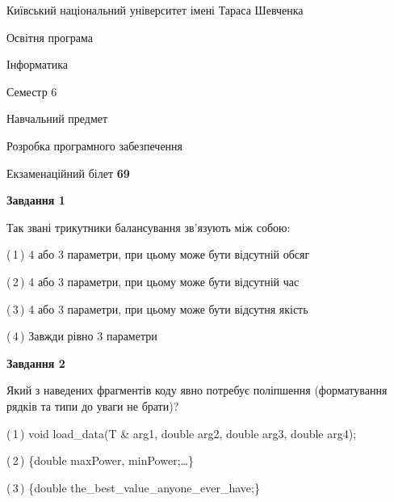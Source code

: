 \documentclass[10pt, ukrainian]{article}
\begin{document}
{{\begin {small}\par
{ \center  Київський національний університет імені Тараса Шевченка \par}
{\parbox {5 cm}{Освітня програма \hfill}{\parbox {7 cm}{Інформатика \hfill}}\parbox {6 cm}{\hfill Семестр 6}}\par
{\parbox {5 cm} {Навчальний предмет \hfill}\parbox {7 cm}{Розробка програмного забезпечення \hfill}\parbox {6cm}{\hfill}\par}\vspace{-7pt} \end{small}}{\center Екзаменаційний білет \No \textbf
{ 69 }\par}}
{
\begin {large}
{\begin {center}\textbf{Завдання 1}\end {center}}\par
Так звані трикутники балансування зв'язують між собою:\par
\vspace{2mm}



(\,1\,) 4 або 3 параметри, при цьому може бути відсутній обсяг %



(\,2\,) 4 або 3 параметри, при цьому може бути відсутній час%



(\,3\,) 4 або 3 параметри, при цьому може бути відсутня якість%



(\,4\,) Завжди рівно 3 параметри%


{\begin {center}\textbf{Завдання 2}\end {center}}\par
Який з наведених фрагментів коду явно потребує поліпшення (форматування рядків та типи до уваги не брати)?\par
\vspace{2mm}



(\,1\,) void load\_data(T \& arg1, double arg2, double arg3, double arg4); %



(\,2\,) \{double maxPower, minPower;…\} %



(\,3\,) \{double the\_best\_value\_anyone\_ever\_have;\} %




\end{large}}
\end{document}
